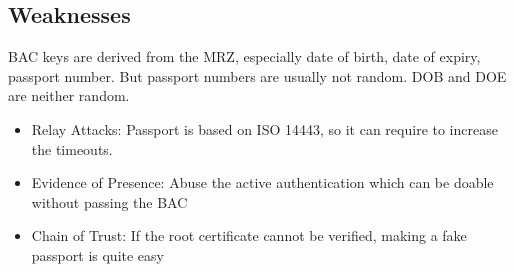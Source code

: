 \subsection{Weaknesses}
BAC keys are derived from the MRZ, especially date of birth, date of expiry,
passport number. But passport numbers are usually not random. DOB and DOE are
neither random.

\begin{itemize}
    \item Relay Attacks: Passport is based on ISO 14443, so it can require to
    increase the timeouts.
    \item Evidence of Presence: Abuse the active authentication which can be
    doable without passing the BAC
    \item Chain of Trust: If the root certificate cannot be verified, making a
    fake passport is quite easy
\end{itemize}
